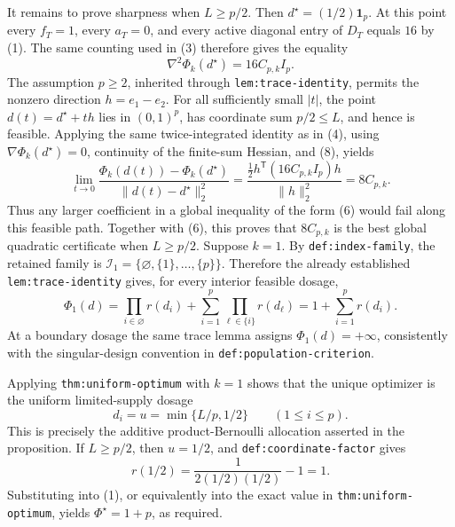 It remains to prove sharpness when \(L\ge p/2\).  Then \(d^\star=(1/2)\mathbf 1_p\).  At this point every \(f_T=1\), every \(a_T=0\), and every active diagonal entry of \(D_T\) equals \(16\) by (1).  The same counting used in (3) therefore gives the equality
\[
 \nabla^2\Phi_k(d^\star)=16C_{p,k}I_p. \tag{8}
\]
The assumption \(p\ge2\), inherited through \texttt{lem:trace-identity}, permits the nonzero direction \(h=e_1-e_2\).  For all sufficiently small \(|t|\), the point \(d(t)=d^\star+th\) lies in \((0,1)^p\), has coordinate sum \(p/2\le L\), and hence is feasible.  Applying the same twice-integrated identity as in (4), using \(\nabla\Phi_k(d^\star)=0\), continuity of the finite-sum Hessian, and (8), yields
\[
 \lim_{t\to0}
 \frac{\Phi_k(d(t))-\Phi_k(d^\star)}
      {\|d(t)-d^\star\|_2^2}
 =\frac{\frac12 h^{\mathsf T}(16C_{p,k}I_p)h}{\|h\|_2^2}
 =8C_{p,k}. \tag{9}
\]
Thus any larger coefficient in a global inequality of the form (6) would fail along this feasible path.  Together with (6), this proves that \(8C_{p,k}\) is the best global quadratic certificate when \(L\ge p/2\).
Suppose \(k=1\).  By \texttt{def:index-family}, the retained family is
\(\mathcal I_1=\{\varnothing,\{1\},\ldots,\{p\}\}\).  Therefore the already established \texttt{lem:trace-identity} gives, for every interior feasible dosage,
\[
 \Phi_1(d)
 =\prod_{i\in\varnothing}r(d_i)
  +\sum_{i=1}^p\prod_{\ell\in\{i\}}r(d_\ell)
 =1+\sum_{i=1}^p r(d_i). \tag{1}
\]
At a boundary dosage the same trace lemma assigns \(\Phi_1(d)=+\infty\), consistently with the singular-design convention in \texttt{def:population-criterion}.

Applying \texttt{thm:uniform-optimum} with \(k=1\) shows that the unique optimizer is the uniform limited-supply dosage
\[
 d_i=u=\min\{L/p,1/2\}\qquad(1\le i\le p).
\]
This is precisely the additive product-Bernoulli allocation asserted in the proposition.  If \(L\ge p/2\), then \(u=1/2\), and \texttt{def:coordinate-factor} gives
\[
 r(1/2)=\frac{1}{2(1/2)(1/2)}-1=1.
\]
Substituting into (1), or equivalently into the exact value in \texttt{thm:uniform-optimum}, yields \(\Phi^\star=1+p\), as required.
